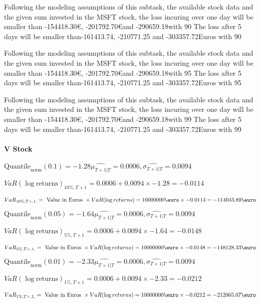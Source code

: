 Following the modeling assumptions of this subtask, the available stock data and the given sum invested in the MSFT stock, the loss incuring over one day will be smaller than -154418.30\euro, -201792.70\euro and -290659.18\euroEuros with 90%
The loss after 5 days will be smaller than-161413.74, -210771.25 and -303357.72Euros with 90%
 

Following the modeling assumptions of this subtask, the available stock data and the given sum invested in the MSFT stock, the loss incuring over one day will be smaller than -154418.30\euro, -201792.70\euro and -290659.18\euroEuros with 95%
The loss after 5 days will be smaller than-161413.74, -210771.25 and -303357.72Euros with 95%
 

Following the modeling assumptions of this subtask, the available stock data and the given sum invested in the MSFT stock, the loss incuring over one day will be smaller than -154418.30\euro, -201792.70\euro and -290659.18\euroEuros with 99%
The loss after 5 days will be smaller than-161413.74, -210771.25 and -303357.72Euros with 99%

\paragraph{V Stock}


$\text{Quantile}_\text{norm}(0.1) = -1.28$$\hat{\mu_{T+1|T}} = 0.0006, \hat{\sigma_{T+1|T}} = 0.0094$

$VaR(\log \text{returns})_{10\%, T + 1} = 0.0006 + 0.0094\times-1.28 = -0.0114$

$VaR_{10\%, T + ,1,} = \text{ Value in Euros } \times VaR(\log returns) = 10 000 000 \text{\euro} \times-0.0114 = -114043.89 \text{\euro}$


$\text{Quantile}_\text{norm}(0.05) = -1.64$$\hat{\mu_{T+1|T}} = 0.0006, \hat{\sigma_{T+1|T}} = 0.0094$

$VaR(\log \text{returns})_{5\%, T + 1} = 0.0006 + 0.0094\times-1.64 = -0.0148$

$VaR_{5\%, T + ,1,} = \text{ Value in Euros } \times VaR(\log returns) = 10 000 000 \text{\euro} \times-0.0148 = -148128.33 \text{\euro}$


$\text{Quantile}_\text{norm}(0.01) = -2.33$$\hat{\mu_{T+1|T}} = 0.0006, \hat{\sigma_{T+1|T}} = 0.0094$

$VaR(\log \text{returns})_{1\%, T + 1} = 0.0006 + 0.0094\times-2.33 = -0.0212$

$VaR_{1\%, T + ,1,} = \text{ Value in Euros } \times VaR(\log returns) = 10 000 000 \text{\euro} \times-0.0212 = -212065.07 \text{\euro}$


